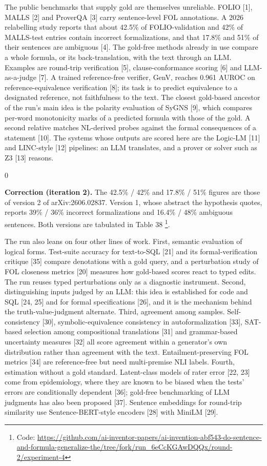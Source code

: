 \documentclass[11pt,letterpaper]{article}
\newenvironment{correction}{\par\medskip\noindent\begin{minipage}{\linewidth}\setlength{\fboxsep}{6pt}\begin{lrbox}{0}\begin{minipage}{0.96\linewidth}\small}{\end{minipage}\end{lrbox}\colorbox{black!6}{\usebox{0}}\end{minipage}\par\medskip}
\begin{document}
The public benchmarks that supply gold are themselves unreliable. FOLIO [1], MALLS [2] and ProverQA [3] carry sentence-level FOL annotations. A 2026 relabelling study reports that about 42.5\% of FOLIO-validation and 42\% of MALLS-test entries contain incorrect formalizations, and that 17.8\% and 51\% of their sentences are ambiguous [4]. The gold-free methods already in use compare a whole formula, or its back-translation, with the text through an LLM. Examples are round-trip verification [5], clause-conformance scoring [6] and LLM-as-a-judge [7]. A trained reference-free verifier, GenV, reaches 0.961 AUROC on reference-equivalence verification [8]; its task is to predict equivalence to a designated reference, not faithfulness to the text. The closest gold-based ancestor of the run's main idea is the polarity evaluation of SyGNS [9], which compares per-word monotonicity marks of a predicted formula with those of the gold. A second relative matches NL-derived probes against the formal consequences of a statement [10]. The systems whose outputs are scored here are the Logic-LM [11] and LINC-style [12] pipelines: an LLM translates, and a prover or solver such as Z3 [13] reasons.

\begin{correction}\textbf{Correction (iteration 2).} The 42.5\% / 42\% and 17.8\% / 51\% figures are those of version 2 of arXiv:2606.02837. Version 1, whose abstract the hypothesis quotes, reports 39\% / 36\% incorrect formalizations and 16.4\% / 48\% ambiguous sentences. Both versions are tabulated in Table 38 \footnote{Code: \url{https://github.com/ai-inventor-papers/ai-invention-abf543-do-sentence-and-formula-generalize-the/tree/fork/run_6eCcKGAwDQQx/round-2/experiment-4}}.\end{correction}

The run also leans on four other lines of work. First, semantic evaluation of logical forms. Test-suite accuracy for text-to-SQL [21] and its formal-verification critique [35] compare denotations with a gold query, and a perturbation study of FOL closeness metrics [20] measures how gold-based scores react to typed edits. The run reuses typed perturbations only as a diagnostic instrument. Second, distinguishing inputs judged by an LLM: this idea is established for code and SQL [24, 25] and for formal specifications [26], and it is the mechanism behind the truth-value-judgment alternate. Third, agreement among samples. Self-consistency [30], symbolic-equivalence consistency in autoformalization [33], SAT-based selection among compositional translations [31] and grammar-based uncertainty measures [32] all score agreement within a generator's own distribution rather than agreement with the text. Entailment-preserving FOL metrics [34] are reference-free but need multi-premise NLI labels. Fourth, estimation without a gold standard. Latent-class models of rater error [22, 23] come from epidemiology, where they are known to be biased when the tests' errors are conditionally dependent [36]; gold-free benchmarking of LLM judgments has also been proposed [37]. Sentence embeddings for round-trip similarity use Sentence-BERT-style encoders [28] with MiniLM [29].
\end{document}
